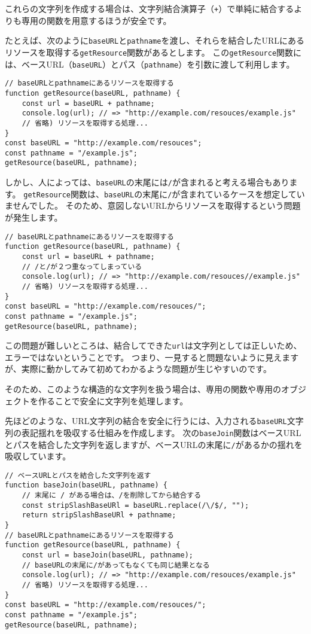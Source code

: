 これらの文字列を作成する場合は、文字列結合演算子（\texttt{+}）で単純に結合するよりも専用の関数を用意するほうが安全です。

たとえば、次のように\texttt{baseURL}と\texttt{pathname}を渡し、それらを結合したURLにあるリソースを取得する\texttt{getResource}関数があるとします。
この\texttt{getResource}関数には、ベースURL（\texttt{baseURL}）とパス（\texttt{pathname}）を引数に渡して利用します。

\begin{lstlisting}
// baseURLとpathnameにあるリソースを取得する
function getResource(baseURL, pathname) {
    const url = baseURL + pathname;
    console.log(url); // => "http://example.com/resouces/example.js"
    // 省略) リソースを取得する処理...
}
const baseURL = "http://example.com/resouces";
const pathname = "/example.js";
getResource(baseURL, pathname);
\end{lstlisting}

しかし、人によっては、\texttt{baseURL}の末尾には\texttt{/}が含まれると考える場合もあります。
\texttt{getResource}関数は、\texttt{baseURL}の末尾に\texttt{/}が含まれているケースを想定していませんでした。
そのため、意図しないURLからリソースを取得するという問題が発生します。

\begin{lstlisting}
// baseURLとpathnameにあるリソースを取得する
function getResource(baseURL, pathname) {
    const url = baseURL + pathname;
    // /と/が２つ重なってしまっている
    console.log(url); // => "http://example.com/resouces//example.js"
    // 省略) リソースを取得する処理...
}
const baseURL = "http://example.com/resouces/";
const pathname = "/example.js";
getResource(baseURL, pathname);
\end{lstlisting}

この問題が難しいところは、結合してできた\texttt{url}は文字列としては正しいため、エラーではないということです。
つまり、一見すると問題ないように見えますが、実際に動かしてみて初めてわかるような問題が生じやすいのです。

そのため、このような構造的な文字列を扱う場合は、専用の関数や専用のオブジェクトを作ることで安全に文字列を処理します。

先ほどのような、URL文字列の結合を安全に行うには、入力される\texttt{baseURL}文字列の表記揺れを吸収する仕組みを作成します。
次の\texttt{baseJoin}関数はベースURLとパスを結合した文字列を返しますが、ベースURLの末尾に\texttt{/}があるかの揺れを吸収しています。

\begin{lstlisting}
// ベースURLとパスを結合した文字列を返す
function baseJoin(baseURL, pathname) {
    // 末尾に / がある場合は、/を削除してから結合する
    const stripSlashBaseURl = baseURL.replace(/\/$/, "");
    return stripSlashBaseURl + pathname;
}
// baseURLとpathnameにあるリソースを取得する
function getResource(baseURL, pathname) {
    const url = baseJoin(baseURL, pathname);
    // baseURLの末尾に/があってもなくても同じ結果となる
    console.log(url); // => "http://example.com/resouces/example.js"
    // 省略) リソースを取得する処理...
}
const baseURL = "http://example.com/resouces/";
const pathname = "/example.js";
getResource(baseURL, pathname);
\end{lstlisting}


